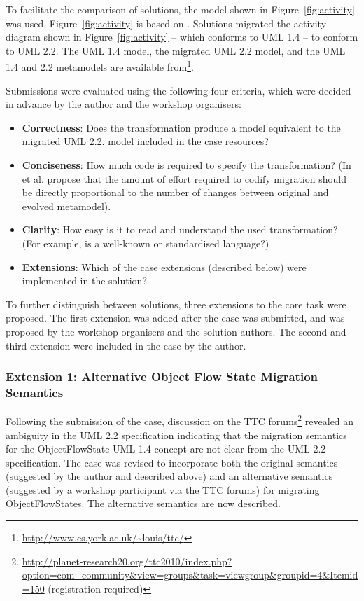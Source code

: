 To facilitate the comparison of solutions, the model shown in Figure~\ref{fig:activity} was used. Figure~\ref{fig:activity} is based on \cite[pg3-165]{uml14}. Solutions migrated the activity diagram shown in Figure~\ref{fig:activity} -- which conforms to UML 1.4 -- to conform to UML 2.2. The UML 1.4 model, the migrated UML 2.2 model, and the UML 1.4 and 2.2 metamodels are available from\footnote{\url{http://www.cs.york.ac.uk/~louis/ttc/}}.

Submissions were evaluated using the following four criteria, which were decided in advance by the author and the workshop organisers:

\begin{itemize}
	\item \textbf{Correctness}: Does the transformation produce a model equivalent to the migrated UML 2.2. model included in the case resources?
	\item \textbf{Conciseness}: How much code is required to specify the transformation? (In \cite{sprinkle04domain} et al. propose that the amount of effort required to codify migration should be directly proportional to the number of changes between original and evolved metamodel).
		\item \textbf{Clarity}: How easy is it to read and understand the used transformation? (For example, is a well-known or standardised language?)
		\item \textbf{Extensions}: Which of the case extensions (described below) were implemented in the solution?
\end{itemize}

To further distinguish between solutions, three extensions to the core task were proposed. The first extension was added after the case was submitted, and was proposed by the workshop organisers and the solution authors. The second and third extension were included in the case by the author. 

\subsubsection{Extension 1: Alternative Object Flow State Migration Semantics}
\label{sub:object_flow_states}
Following the submission of the case, discussion on the TTC forums\footnote{\url{http://planet-research20.org/ttc2010/index.php?option=com_community&view=groups&task=viewgroup&groupid=4&Itemid=150} (registration required)} revealed an ambiguity in the UML 2.2 specification indicating that the migration semantics for the ObjectFlowState UML 1.4 concept are not clear from the UML 2.2 specification. The case was revised to incorporate both the original semantics (suggested by the author and described above) and an alternative semantics (suggested by a workshop participant via the TTC forums) for migrating ObjectFlowStates. The alternative semantics are now described.

